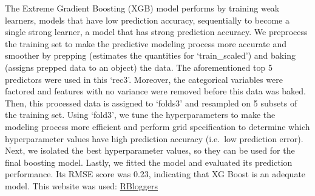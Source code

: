 \documentclass[
]{article}
\begin{document}
The Extreme Gradient Boosting (XGB) model performs by training weak
learners, models that have low prediction accuracy, sequentially to
become a single strong learner, a model that has strong prediction
accuracy. We preprocess the training set to make the predictive modeling
process more accurate and smoother by prepping (estimates the quantities
for `train\_scaled') and baking (assigns prepped data to an object) the
data. The aforementioned top 5 predictors were used in this `rec3'.
Moreover, the categorical variables were factored and features with no
variance were removed before this data was baked. Then, this processed
data is assigned to `folds3' and resampled on 5 subsets of the training
set. Using `fold3', we tune the hyperparameters to make the modeling
process more efficient and perform grid specification to determine which
hyperparameter values have high prediction accuracy (i.e.~low prediction
error). Next, we isolated the best hyperparameter values, so they can be
used for the final boosting model. Lastly, we fitted the model and
evaluated its prediction performance. Its RMSE score was 0.23,
indicating that XG Boost is an adequate model. This website was used:
\href{https://www.r-bloggers.com/2020/05/using-xgboost-with-tidymodels/}{RBloggers}
\end{document}
